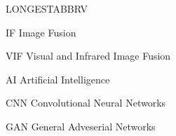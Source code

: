 \begin{theglossary}{LONGESTABBRV}

\item[IF] Image Fusion
\item[VIF] Visual and Infrared Image Fusion 
\item[AI] Artificial Intelligence
\item[CNN] Convolutional Neural Networks
\item[GAN] General Adveserial Networks   
\end{theglossary}

